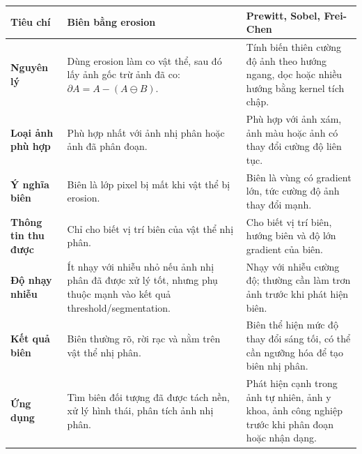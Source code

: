 \small
\begin{longtable}{|p{}|p{}|p{}|}
\hline
\textbf{Tiêu chí} & \textbf{Biên bằng erosion} & \textbf{Prewitt, Sobel, Frei-Chen} \\
\hline
\textbf{Nguyên lý} & Dùng erosion làm co vật thể, sau đó lấy ảnh gốc trừ ảnh đã co: $\partial A=A-(A\ominus B)$. & Tính biến thiên cường độ ảnh theo hướng ngang, dọc hoặc nhiều hướng bằng kernel tích chập. \\
\hline
\textbf{Loại ảnh phù hợp} & Phù hợp nhất với ảnh nhị phân hoặc ảnh đã phân đoạn. & Phù hợp với ảnh xám, ảnh màu hoặc ảnh có thay đổi cường độ liên tục. \\
\hline
\textbf{Ý nghĩa biên} & Biên là lớp pixel bị mất khi vật thể bị erosion. & Biên là vùng có gradient lớn, tức cường độ ảnh thay đổi mạnh. \\
\hline
\textbf{Thông tin thu được} & Chỉ cho biết vị trí biên của vật thể nhị phân. & Cho biết vị trí biên, hướng biên và độ lớn gradient của biên. \\
\hline
\textbf{Độ nhạy nhiễu} & Ít nhạy với nhiễu nhỏ nếu ảnh nhị phân đã được xử lý tốt, nhưng phụ thuộc mạnh vào kết quả threshold/segmentation. & Nhạy với nhiễu cường độ; thường cần làm trơn ảnh trước khi phát hiện biên. \\
\hline
\textbf{Kết quả biên} & Biên thường rõ, rời rạc và nằm trên vật thể nhị phân. & Biên thể hiện mức độ thay đổi sáng tối, có thể cần ngưỡng hóa để tạo biên nhị phân. \\
\hline
\textbf{Ứng dụng} & Tìm biên đối tượng đã được tách nền, xử lý hình thái, phân tích ảnh nhị phân. & Phát hiện cạnh trong ảnh tự nhiên, ảnh y khoa, ảnh công nghiệp trước khi phân đoạn hoặc nhận dạng. \\
\hline
\end{longtable}
\normalsize